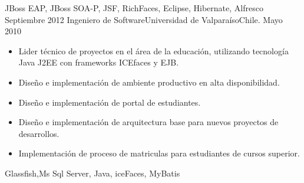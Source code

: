 \begin{experiences}
{                    }
                    {JBoss EAP, JBoss SOA-P, JSF, RichFaces, Eclipse, Hibernate, Alfresco}
  \emptySeparator
  \experience
    {Septiembre 2012}     {Ingeniero de Software}{Universidad de Valpara\'iso}{Chile.}
    {Mayo 2010}    {
                      \begin{itemize}
                        \item Lider técnico de proyectos en el área de la educación, utilizando tecnología Java J2EE con frameworks ICEfaces y EJB.
                        \item Diseño e implementaci\'on de ambiente productivo en alta disponibilidad.
                        \item Diseño e implementaci\'on de portal de estudiantes.
                        \item Diseño e implementaci\'on de arquitectura base para nuevos proyectos de desarrollos.
                        \item Implementaci\'on de proceso de matriculas para estudiantes de cursos superior.
                      \end{itemize}
                    }
                    {Glassfish,Ms Sql Server, Java, iceFaces, MyBatis}


\end{experiences}
